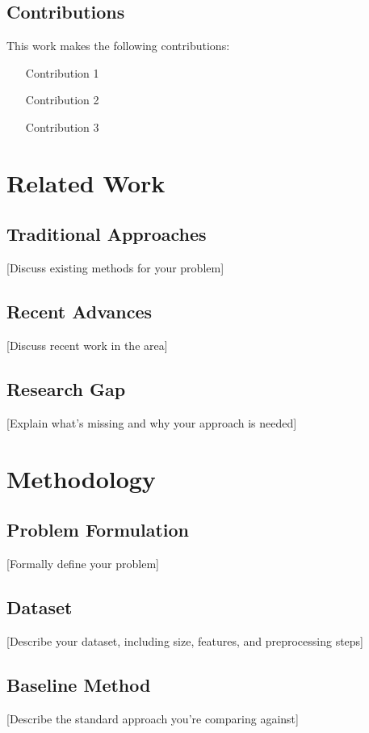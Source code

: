 \documentclass[sigconf]{acmart}
\begin{document}
\subsection{Contributions}
This work makes the following contributions:
\begin{itemize}
    \item [Contribution 1]
    \item [Contribution 2]
    \item [Contribution 3]
\end{itemize}

\section{Related Work}
\label{sec:related_work}

\subsection{Traditional Approaches}
[Discuss existing methods for your problem]

\subsection{Recent Advances}
[Discuss recent work in the area]

\subsection{Research Gap}
[Explain what's missing and why your approach is needed]

\section{Methodology}
\label{sec:methodology}

\subsection{Problem Formulation}
[Formally define your problem]

\subsection{Dataset}
[Describe your dataset, including size, features, and preprocessing steps]

\subsection{Baseline Method}
[Describe the standard approach you're comparing against]
\end{document}
